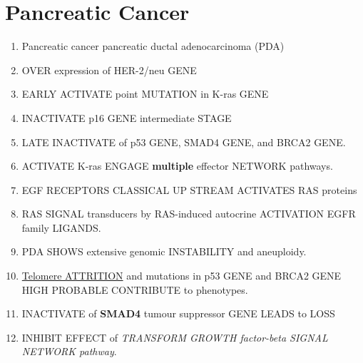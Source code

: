 

\section{Pancreatic Cancer}

\begin{enumerate}
	\item Pancreatic cancer pancreatic ductal adenocarcinoma (PDA) 
	\item OVER expression of HER-2/neu GENE
	\item EARLY ACTIVATE point MUTATION in K-ras GENE 
	\item INACTIVATE p16 GENE intermediate STAGE 
	\item LATE INACTIVATE of p53 GENE, SMAD4 GENE, and BRCA2 GENE. 
	\item ACTIVATE K-ras ENGAGE \textbf{multiple} effector NETWORK pathways.  
	\item EGF RECEPTORS CLASSICAL UP STREAM ACTIVATES RAS proteins
	\item RAS SIGNAL transducers by RAS-induced autocrine ACTIVATION EGFR family LIGANDS.
	\item PDA SHOWS extensive genomic INSTABILITY and aneuploidy.
	\item \underline{Telomere ATTRITION} and mutations in p53 GENE and BRCA2 GENE HIGH PROBABLE CONTRIBUTE to phenotypes. 
	\item INACTIVATE of \textbf{SMAD4} tumour suppressor GENE LEADS to LOSS 
	\item INHIBIT EFFECT of \textit{TRANSFORM GROWTH factor-beta SIGNAL NETWORK pathway}.
\end{enumerate}
